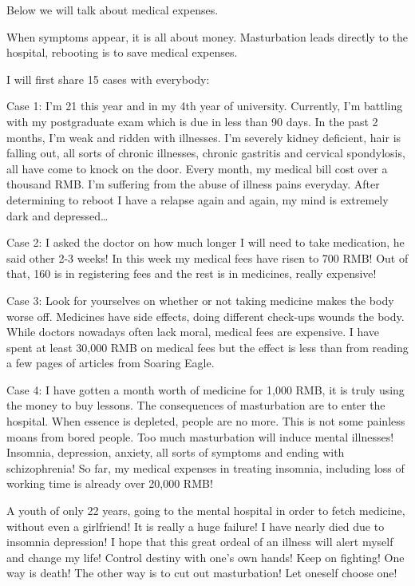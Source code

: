 \documentclass[
]{book}
\begin{document}
Below we will talk about medical expenses.

When symptoms appear, it is all about money. Masturbation leads directly to the hospital, rebooting is to save medical expenses.

I will first share 15 cases with everybody:

Case 1: I'm 21 this year and in my 4th year of university. Currently, I'm battling with my postgraduate exam which is due in less than 90 days. In the past 2 months, I'm weak and ridden with illnesses. I'm severely kidney deficient, hair is falling out, all sorts of chronic illnesses, chronic gastritis and cervical spondylosis, all have come to knock on the door. Every month, my medical bill cost over a thousand RMB. I'm suffering from the abuse of illness pains everyday. After determining to reboot I have a relapse again and again, my mind is extremely dark and depressed\ldots{}

Case 2: I asked the doctor on how much longer I will need to take medication, he said other 2-3 weeks! In this week my medical fees have risen to 700 RMB! Out of that, 160 is in registering fees and the rest is in medicines, really expensive!

Case 3: Look for yourselves on whether or not taking medicine makes the body worse off. Medicines have side effects, doing different check-ups wounds the body. While doctors nowadays often lack moral, medical fees are expensive. I have spent at least 30,000 RMB on medical fees but the effect is less than from reading a few pages of articles from Soaring Eagle.

Case 4: I have gotten a month worth of medicine for 1,000 RMB, it is truly using the money to buy lessons. The consequences of masturbation are to enter the hospital. When essence is depleted, people are no more. This is not some painless moans from bored people. Too much masturbation will induce mental illnesses! Insomnia, depression, anxiety, all sorts of symptoms and ending with schizophrenia! So far, my medical expenses in treating insomnia, including loss of working time is already over 20,000 RMB!

A youth of only 22 years, going to the mental hospital in order to fetch medicine, without even a girlfriend! It is really a huge failure! I have nearly died due to insomnia depression! I hope that this great ordeal of an illness will alert myself and change my life! Control destiny with one's own hands! Keep on fighting! One way is death! The other way is to cut out masturbation! Let oneself choose one!
\end{document}
